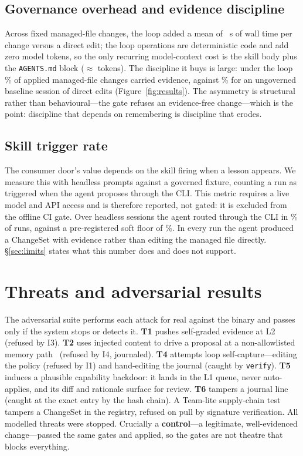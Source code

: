 \documentclass[10pt,twocolumn]{article}
\begin{document}
\subsection{Governance overhead and evidence discipline}
Across \overheadTasks{} fixed managed-file changes, the loop added a mean
of \overheadSeconds~s of wall time per change versus a direct edit; the
loop operations are deterministic code and add zero model tokens, so the
only recurring model-context cost is the skill body plus the
\texttt{AGENTS.md} block ($\approx$\overheadTokens{} tokens). The
discipline it buys is large: under the loop \evLoopRate\% of applied
managed-file changes carried evidence, against \evBaselineRate\% for an
ungoverned baseline session of direct edits (Figure~\ref{fig:results}).
The asymmetry is structural rather than behavioural---the gate refuses an
evidence-free change---which is the point: discipline that depends on
remembering is discipline that erodes.

\subsection{Skill trigger rate}
The consumer door's value depends on the skill firing when a lesson
appears. We measure this with headless prompts against a governed fixture,
counting a run as triggered when the agent proposes through the CLI. This
metric requires a live model and API access and is therefore reported, not
gated: it is excluded from the offline CI gate. Over \triggerN{} headless
sessions the agent routed through the CLI in \triggerRate\% of runs,
against a pre-registered soft floor of \triggerFloor\%. In every run the agent
produced a ChangeSet with evidence rather than editing the managed file
directly. \S\ref{sec:limits} states what this number does and does not
support.

\section{Threats and adversarial results}
\label{sec:threats}
The adversarial suite performs each attack for real against the binary and
passes only if the system stops or detects it. \textbf{T1} pushes
self-graded evidence at L2 (refused by I3). \textbf{T2} uses injected
content to drive a proposal at a non-allowlisted memory
path~\cite{minja} (refused by I4, journaled). \textbf{T4} attempts loop
self-capture---editing the policy (refused by I1) and hand-editing the
journal (caught by \texttt{verify}). \textbf{T5} induces a plausible
capability backdoor: it lands in the L1 queue, never auto-applies, and its
diff and rationale surface for review. \textbf{T6} tampers a journal line
(caught at the exact entry by the hash chain). A Team-lite supply-chain
test tampers a ChangeSet in the registry, refused on pull by signature
verification. All \advDetections{} modelled threats were stopped. Crucially
a \textbf{control}---a legitimate, well-evidenced change---passed the same
gates and applied, so the gates are not theatre that blocks everything.
\end{document}
